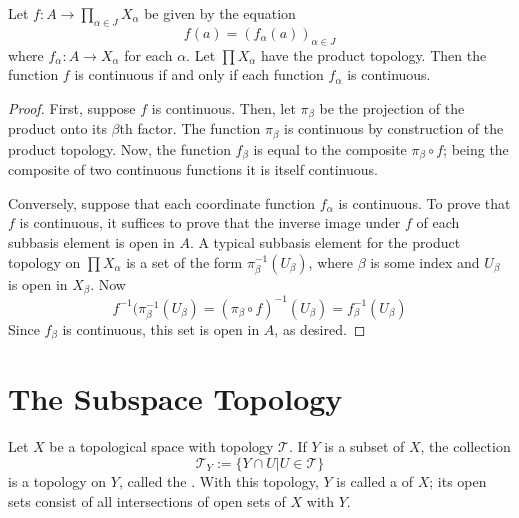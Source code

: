 \documentclass[12pt, a4paper, oneside, openright, titlepage]{book}
\begin{document}
\begin{theorem}
    Let $f:A\rightarrow \prod_{\alpha \in J}X_{\alpha}$ be given by the equation \begin{equation*}
        f(a) = (f_{\alpha}(a))_{\alpha \in J}
    \end{equation*}
    where $f_{\alpha}:A\rightarrow X_{\alpha}$ for each $\alpha$. Let $\prod X_{\alpha}$ have the product topology. Then the function $f$ is continuous if and only if each function $f_{\alpha}$ is continuous.
\end{theorem}
\begin{proof}
    First, suppose $f$ is continuous. Then, let $\pi_{\beta}$ be the projection of the product onto its $\beta$th factor. The function $\pi_{\beta}$ is continuous by construction of the product topology. Now, the function $f_{\beta}$ is equal to the composite $\pi_{\beta} \circ f$; being the composite of two continuous functions it is itself continuous.

    Conversely, suppose that each coordinate function $f_{\alpha}$ is continuous. To prove that $f$ is continuous, it suffices to prove that the inverse image under $f$ of each subbasis element is open in $A$. A typical subbasis element for the product topology on $\prod X_{\alpha}$ is a set of the form $\pi^{-1}_{\beta}(U_{\beta})$, where $\beta$ is some index and $U_{\beta}$ is open in $X_{\beta}$. Now \begin{equation*}
        f^{-1}(\pi_{\beta}^{-1}(U_{\beta}) = (\pi_{\beta}\circ f)^{-1}(U_{\beta}) = f_{\beta}^{-1}(U_{\beta})
    \end{equation*}
    Since $f_{\beta}$ is continuous, this set is open in $A$, as desired.
\end{proof}




\section{The Subspace Topology}

\begin{definition}
    Let $X$ be a topological space with topology $\mathcal{T}$. If $Y$ is a subset of $X$, the collection \begin{equation*}
        \mathcal{T}_Y :=\{Y\cap U\vert U \in \mathcal{T}\}
    \end{equation*}
    is a topology on $Y$, called the . With this topology, $Y$ is called a  of $X$; its open sets consist of all intersections of open sets of $X$ with $Y$.
\end{definition}
\end{document}
